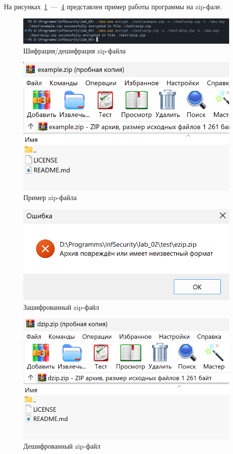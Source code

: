 На рисунках~\ref{fig:zex}~---~\ref{fig:zd} представлен пример работы программы на zip-фале.

\begin{figure}[h]
    \centering
    \includegraphics[width=0.9\linewidth]{images/zex.png}
    \caption{Шифрация/дешифрация zip-файла}
    \label{fig:zex}
\end{figure}

\begin{figure}[h]
    \centering
    \includegraphics[width=0.6\linewidth]{images/fzip.png}
    \caption{Пример zip-файла}
    \label{fig:z1}
\end{figure}

\begin{figure}[h]
    \centering
    \includegraphics[width=0.6\linewidth]{images/ezip.png}
    \caption{Зашифрованный zip-файл}
    \label{fig:ze}
\end{figure}

\begin{figure}[h]
    \centering
    \includegraphics[width=0.6\linewidth]{images/dzip.png}
    \caption{Дешифрованный zip-файл}
    \label{fig:zd}
\end{figure}
